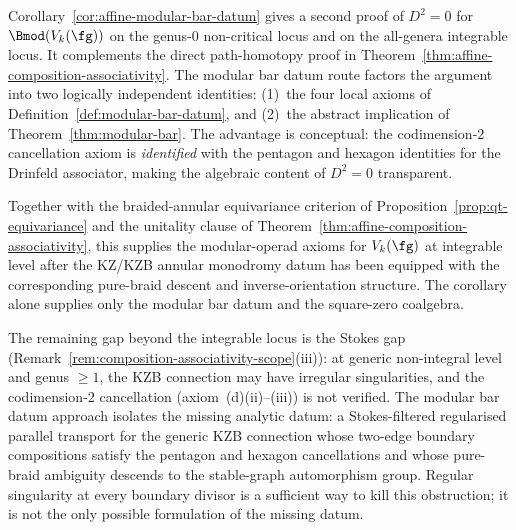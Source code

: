 \begin{remark}
\label{rem:modular-bar-vs-operadic}
%
Corollary~\textup{\ref{cor:affine-modular-bar-datum}}
gives a second proof of \(D^2=0\) for \(\Bmod(V_k(\fg))\) on the
genus-\(0\) non-critical locus and on the all-genera integrable
locus.  It complements the direct path-homotopy proof in
Theorem~\textup{\ref{thm:affine-composition-associativity}}.
The modular bar datum route factors the argument into
two logically independent identities: \textup{(1)}~the
four local axioms of
Definition~\textup{\ref{def:modular-bar-datum}}, and
\textup{(2)}~the abstract implication of
Theorem~\textup{\ref{thm:modular-bar}}. The advantage
is conceptual: the codimension-$2$ cancellation axiom is
\emph{identified} with the pentagon and hexagon
identities for the Drinfeld associator, making the
algebraic content of $D^2 = 0$ transparent.

Together with the braided-annular equivariance criterion of
Proposition~\textup{\ref{prop:qt-equivariance}} and the unitality
clause of Theorem~\textup{\ref{thm:affine-composition-associativity}},
this supplies the modular-operad axioms for \(V_k(\fg)\) at
integrable level after the KZ/KZB annular monodromy datum has been
equipped with the corresponding pure-braid descent and
inverse-orientation structure.  The corollary alone supplies only the
modular bar datum and the square-zero coalgebra.

The remaining gap beyond the integrable locus is the
Stokes gap
\textup{(}Remark~\textup{\ref{rem:composition-associativity-scope}(iii)}\textup{)}:
at generic non-integral level and genus $\ge 1$, the
KZB connection may have irregular singularities, and
the codimension-$2$ cancellation
\textup{(}axiom~(d)(ii)--(iii)\textup{)} is not verified.
The modular bar datum approach isolates the missing analytic datum:
a Stokes-filtered regularised parallel transport for the generic
KZB connection whose two-edge boundary compositions satisfy the
pentagon and hexagon cancellations and whose pure-braid ambiguity
descends to the stable-graph automorphism group.  Regular singularity
at every boundary divisor is a sufficient way to kill this obstruction;
it is not the only possible formulation of the missing datum.
\end{remark}


